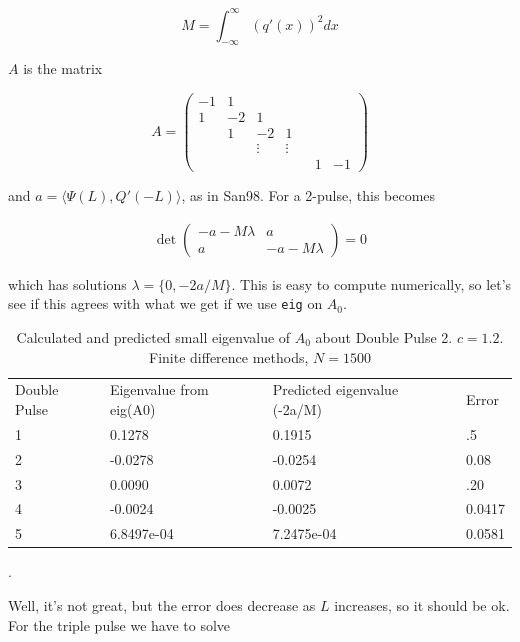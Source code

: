 \documentclass[12pt]{article}
\begin{document}
\begin{equation}
M = \int_{-\infty}^\infty (q'(x))^2 dx
\end{equation}

$A$ is the matrix

\begin{equation}
A = \begin{pmatrix}
-1 & 1 \\
1  & -2 & 1 \\
   & 1  & -2 & 1 \\
   & & \vdots & \vdots \\
   & & & & & 1 & -1
\end{pmatrix}
\end{equation}

and $a = \langle \Psi(L), Q'(-L) \rangle$, as in San98. For a 2-pulse, this becomes

\begin{align*}
\det \begin{pmatrix}
-a - M \lambda & a \\
a & -a - M \lambda
\end{pmatrix} = 0
\end{align*}

which has solutions $\lambda = \{ 0, -2a/M \}$. This is easy to compute numerically, so let's see if this agrees with what we get if we use \texttt{eig} on $A_0$.

\begin{table}[H]
\begin{tabular}{llll}
Double Pulse & Eigenvalue from eig(A0) & Predicted eigenvalue (-2a/M) & Error  \\
1            & 0.1278                  & 0.1915                       & .5     \\
2            & -0.0278                 & -0.0254                      & 0.08   \\
3            & 0.0090                  & 0.0072                       & .20    \\
4            & -0.0024                 & -0.0025                      & 0.0417 \\
5            & 6.8497e-04              & 7.2475e-04                   & 0.0581
\end{tabular}
\caption{Calculated and predicted small eigenvalue of $A_0$ about Double Pulse 2. $c = 1.2$. Finite difference methods, $N = 1500$}.
\end{table}

Well, it's not great, but the error does decrease as $L$ increases, so it should be ok. For the triple pulse we have to solve
\end{document}
